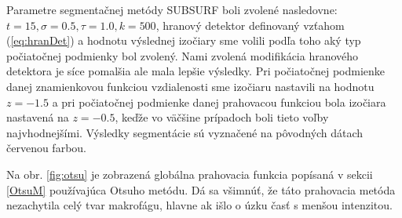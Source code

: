 \documentclass[a4paper,11pt,oneside]{article}%
\begin{document}
Parametre segmentačnej metódy SUBSURF boli zvolené nasledovne:
$t = 15, \sigma = 0.5, \tau = 1.0, k = 500$, hranový detektor definovaný  vzťahom (\ref{eq:hranDet}) a hodnotu výslednej izočiary sme volili podľa toho aký typ počiatočnej podmienky bol zvolený. Nami zvolená modifikácia hranového detektora je síce pomalšia ale mala lepšie výsledky. Pri počiatočnej podmienke danej znamienkovou funkciou vzdialenosti sme izočiaru nastavili na hodnotu $z = -1.5$ a pri počiatočnej podmienke danej prahovacou funkciou bola izočiara nastavená na $z = -0.5$, keďže vo väčšine prípadoch boli tieto voľby najvhodnejšími. Výsledky segmentácie sú vyznačené na pôvodných dátach červenou farbou. 


Na obr. \ref{fig:otsu} je zobrazená globálna prahovacia funkcia popísaná v sekcii \ref{OtsuM} používajúca Otsuho metódu. Dá sa všimnúť, že táto prahovacia metóda nezachytila celý tvar makrofágu, hlavne ak išlo o úzku časť s menšou intenzitou.
\end{document}

